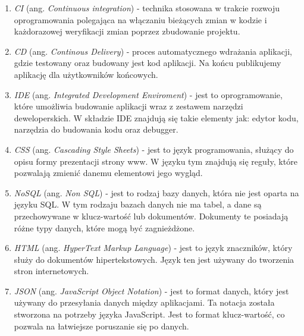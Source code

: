 \begin{enumerate}
    \item \label{CI} \textit{CI} (ang. \textit{Continuous integration}) - technika stosowana w trakcie rozwoju oprogramowania polegająca na włączaniu bieżących zmian w kodzie i każdorazowej weryfikacji zmian poprzez zbudowanie projektu.
    \item \label{CD} \textit{CD} (ang. \textit{Continous Delivery}) - proces automatycznego wdrażania aplikacji, gdzie testowany oraz budowany jest kod aplikacji. Na końcu publikujemy aplikację dla użytkowników końcowych.
    \item \label{IDE} \textit{IDE} (ang. \textit{Integrated Development Enviroment}) - jest to oprogramowanie, które umożliwia budowanie aplikacji wraz z zestawem narzędzi deweloperskich. W składzie IDE znajdują się takie elementy jak: edytor kodu, narzędzia do budowania kodu oraz debugger.
    \item \label{CSS} \textit{CSS} (ang. \textit{Cascading Style Sheets}) - jest to język programowania, służący do opisu formy prezentacji strony www. W języku tym znajdują się reguły, które pozwalają zmienić danemu elementowi jego wygląd.
    \item \label{NoSQL} \textit{NoSQL} (ang. \textit{Non SQL}) - jest to rodzaj bazy danych, która nie jest oparta na języku SQL. W tym rodzaju bazach danych nie ma tabel, a dane są przechowywane w klucz-wartość lub dokumentów. Dokumenty te posiadają różne typy danych, które mogą być zagnieżdżone.
    \item \label{HTML} \textit{HTML} (ang. \textit{HyperText Markup Language}) - jest to język znaczników, który służy do dokumentów hipertekstowych. Język ten jest używany do tworzenia stron internetowych.
    \item \label{JSON} \textit{JSON} (ang. \textit{JavaScript Object Notation}) - jest to format danych, który jest używany do przesyłania danych między aplikacjami. Ta notacja została stworzona na potrzeby języka JavaScript. Jest to format klucz-wartość, co pozwala na łatwiejsze poruszanie się po danych.
\end{enumerate}
